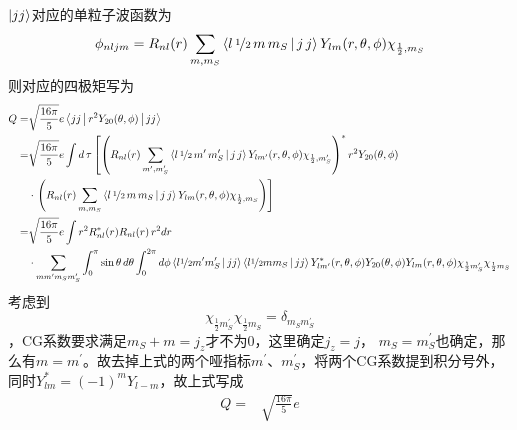 \vspace{3mm}
\begin{exercise*}[C.14]
    $\ket{jj}$对应的单粒子波函数为
    \begin{equation*}
        \phi_{nljm} = R_{nl}(r) \sum_{m, m_{S}} \Braket{l\,\nicefrac{1}{2}\,m\,m_{S} | j\,j} Y_{lm}(r, \theta, \phi) \chi_{\frac{1}{2}, m_{S}}
    \end{equation*}
    则对应的四极矩写为
    \begin{equation*}
        \begin{aligned}
            Q =& \sqrt{\frac{16\pi}{5}} e \Braket{jj| r^2 Y_{20}(\theta, \phi) | jj} \\
            =&\sqrt{\frac{16\pi}{5}} e 
            \int d\,\tau \left[\left(R_{nl}(r) \sum_{m^{\prime}, m_{S}^{\prime}} \Braket{l\,\nicefrac{1}{2}\,m^{\prime}\,m_{S}^{\prime} | j\,j} Y_{lm^{\prime}}(r, \theta, \phi) \chi_{\frac{1}{2}, m_{S}^{\prime}}\right)^{\ast}
            r^2 Y_{20}(\theta, \phi) \right.\\
            & \cdot \left. \left(R_{nl}(r) \sum_{m, m_{S}} \Braket{l\,\nicefrac{1}{2}\,m\,m_{S} | j\,j} Y_{lm}(r, \theta, \phi) \chi_{\frac{1}{2}, m_{S}}\right) \right] \\
            =& \sqrt{\frac{16\pi}{5}} e
              \int r^2 R_{nl}^{\ast}(r) R_{nl}(r)\, r^2dr \\
             &\cdot
               \sum_{mm^{\prime}m_{S}m_{S}^{\prime}} \int_{0}^{\pi}\sin{\theta}\, d\theta \int_{0}^{2\pi} d\phi \Braket{l\nicefrac{1}{2}m^{\prime}m_{S}^{\prime} | jj}\Braket{l\nicefrac{1}{2}mm_{S} | jj}
               Y_{lm^{\prime}}^{\ast}(r, \theta, \phi) Y_{20}(\theta, \phi) Y_{lm}(r, \theta, \phi) \chi_{\frac{1}{2}m_{S}^{\prime}} \chi_{\frac{1}{2}m_{S}}\\
        \end{aligned}
    \end{equation*}
    考虑到
    \begin{equation*}
        \chi_{\frac{1}{2}m_{S}^{\prime}} \chi_{\frac{1}{2}m_{S}} = \delta_{m_{S}m_{S}^{\prime}}
    \end{equation*}
    ，CG系数要求满足$m_S + m = j_z$才不为0，这里确定$j_z = j$， $m_S = m_S^{\prime}$也确定，那么有$m = m^{\prime}$。故去掉上式的两个哑指标$m^{\prime}$、$m^{\prime}_{S}$，将两个CG系数提到积分号外，同时$Y^{\ast}_{lm} = (-1)^{m}Y_{l-m}$，故上式写成
    \begin{equation*}
        \begin{aligned}
        Q =& \sqrt{\frac{16\pi}{5}} e

\end{aligned}
\end{equation*}
\end{exercise*}
